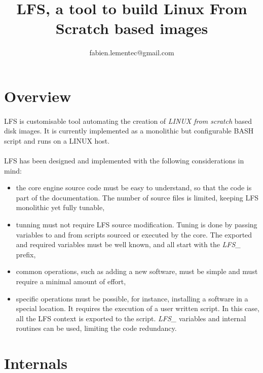 \documentclass[a4paper, 11pt]{article}
\begin{document}
\title{LFS, a tool to build Linux From Scratch based images}
\author{fabien.lementec@gmail.com}
\date{}

\maketitle

\newpage
\tableofcontents
{}


\newpage
\section{Overview}

\paragraph{}
LFS is customisable tool automating the creation of \textit{LINUX from scratch}
based disk images. It is currently implemented as a monolithic but configurable
BASH script and runs on a LINUX host.

\paragraph{}
LFS has been designed and implemented with the following considerations in mind:
\begin{itemize}
\item the core engine source code must be easy to understand, so that the code
is part of the documentation. The number of source files is limited, keeping LFS
monolithic yet fully tunable,
\item tunning must not require LFS source modification. Tuning is done by passing
variables to and from scripts sourced or executed by the core. The exported and
required variables must be well known, and all start with the \textit{LFS\_}
prefix,
\item common operations, such as adding a new software, must be simple and must
require a minimal amount of effort,
\item specific operations must be possible, for instance, installing a software
in a special location. It requires the execution of a user written script. In
this case, all the LFS context is exported to the script. \textit{LFS\_} variables
and internal routines can be used, limiting the code redundancy.
\end{itemize}


\clearpage
\section{Internals}
\end{document}

